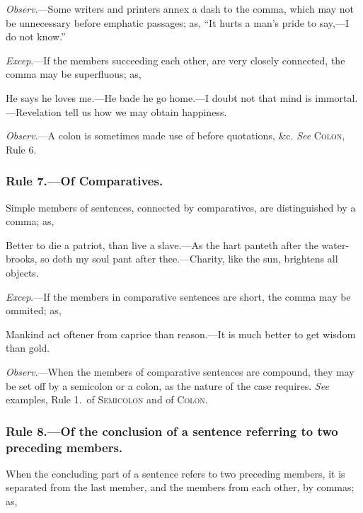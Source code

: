 \emph{Observ}.---Some writers and printers annex a dash to the comma, which may
not be unnecessary before emphatic passages; as, ``It hurts a man's pride to
say,---I do not know.''

\emph{Excep}.---If the members succeeding each other, are very closely
connected, the comma may be superfluous; as,

\begin{example}
    He says he loves me.---He bade he go home.---I doubt not that mind is
    immortal.---Revelation tell us how we may obtain happiness.
\end{example}

\emph{Observ}.---A colon is sometimes made use of before quotations, \&c.
\emph{See} \textsc{Colon}, Rule 6.

\subsubsection{Rule 7.---Of Comparatives.}

Simple members of sentences, connected by comparatives, are distinguished by a
comma; as,

\begin{example}
    Better to die a patriot, than live a slave.---As the hart panteth after the
    water-brooks, so doth my soul pant after thee.---Charity, like the sun,
    brightens all objects.
\end{example}

\emph{Excep}.---If the members in comparative sentences are short, the comma may
be ommited; as,

\begin{example}
    Mankind act oftener from caprice than reason.---It is much better to get
    wisdom than gold.
\end{example}

\emph{Observ}.---When the members of comparative sentences are compound, they
may be set off by a semicolon or a colon, as the nature of the case requires.
\emph{See} examples, Rule 1.\ of \textsc{Semicolon} and of \textsc{Colon}.

\subsubsection{Rule 8.---Of the conclusion of a sentence referring to two
preceding members.}

When the concluding part of a sentence refers to two preceding members, it is
separated from the last member, and the members from each other, by commas; as,

